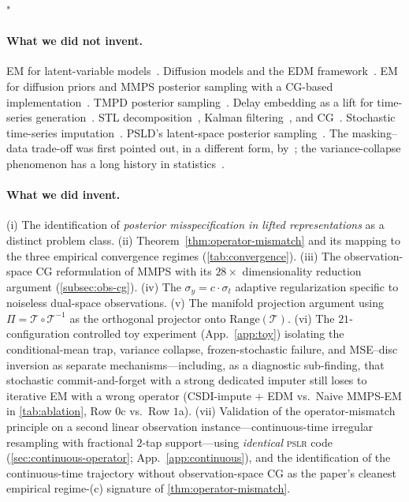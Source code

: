 "\documentclass{article}
\theoremstyle{plain}
\theoremstyle{definition}
\theoremstyle{remark}
\newcommand{\tsimg}{\mathcal{T}}
\newcommand{\imgts}{\mathcal{T}^{-1}}
\newcommand{\pslr}{\textsc{pslr}}
\begin{document}
\paragraph{What we did not invent.}
EM for latent-variable models~\citep{dempster1977em}. Diffusion models and the EDM framework~\citep{karras2022edm,ho2020ddpm,song2021sde}. EM for diffusion priors and MMPS posterior sampling with a CG-based implementation~\citep{rozet2024diem}. TMPD posterior sampling~\citep{boys2023tmpd}. Delay embedding as a lift for time-series generation~\citep{takens1981embedding,naiman2024imagentime}. STL decomposition~\citep{cleveland1990stl}, Kalman filtering~\citep{kalman1960new}, and CG~\citep{hestenes1952cg}. Stochastic time-series imputation~\citep{tashiro2021csdi}. PSLD's latent-space posterior sampling~\citep{rout2024psld}. The masking--data trade-off was first pointed out, in a different form, by~\citep{fadlon2025imageni2r}; the variance-collapse phenomenon has a long history in statistics~\citep{rubin1987multiple}.

\paragraph{What we did invent.}
(i) The identification of \emph{posterior misspecification in lifted representations} as a distinct problem class. (ii) Theorem~\ref{thm:operator-mismatch} and its mapping to the three empirical convergence regimes (\cref{tab:convergence}). (iii) The observation-space CG reformulation of MMPS with its $28\times$ dimensionality reduction argument (\cref{subsec:obs-cg}). (iv) The $\sigma_y = c \cdot \sigma_t$ adaptive regularization specific to noiseless dual-space observations. (v) The manifold projection argument using $\Pi = \tsimg \circ \imgts$ as the orthogonal projector onto $\mathrm{Range}(\tsimg)$. (vi) The $21$-configuration controlled toy experiment (App.~\ref{app:toy}) isolating the conditional-mean trap, variance collapse, frozen-stochastic failure, and MSE--disc inversion as separate mechanisms---including, as a diagnostic sub-finding, that stochastic commit-and-forget with a strong dedicated imputer still loses to iterative EM with a wrong operator (CSDI-impute $+$ EDM vs.\ Naive MMPS-EM in \cref{tab:ablation}, Row $0$c vs.\ Row $1$a). (vii) Validation of the operator-mismatch principle on a second linear observation instance---continuous-time irregular resampling with fractional $2$-tap support---using \emph{identical} \pslr{} code (\cref{sec:continuous-operator}; App.~\ref{app:continuous}), and the identification of the continuous-time trajectory without observation-space CG as the paper's cleanest empirical regime-(c) signature of \cref{thm:operator-mismatch}.
\end{document}
